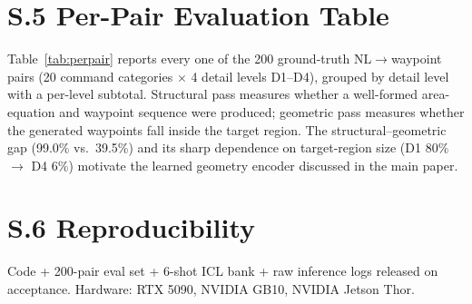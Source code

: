 \documentclass{article}
\begin{document}
\section*{S.5 Per-Pair Evaluation Table}
Table~\ref{tab:perpair} reports every one of the 200 ground-truth NL$\to$waypoint pairs
(20 command categories $\times$ 4 detail levels D1--D4), grouped by detail level with a
per-level subtotal. Structural pass measures whether a well-formed area-equation and
waypoint sequence were produced; geometric pass measures whether the generated waypoints
fall inside the target region. The structural--geometric gap (99.0\% vs.\ 39.5\%) and its
sharp dependence on target-region size (D1 80\% $\to$ D4 6\%) motivate the learned geometry
encoder discussed in the main paper.



\section*{S.6 Reproducibility}
Code + 200-pair eval set + 6-shot ICL bank + raw inference logs released on acceptance.
Hardware: RTX 5090, NVIDIA GB10, NVIDIA Jetson Thor.
\end{document}

